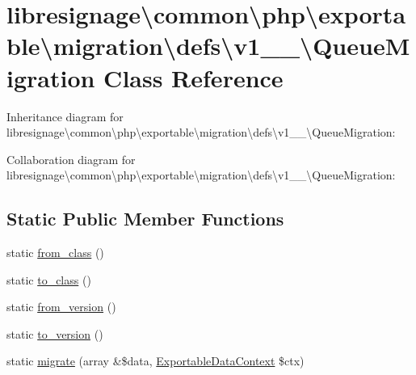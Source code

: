 \hypertarget{classlibresignage_1_1common_1_1php_1_1exportable_1_1migration_1_1defs_1_1v1__1__0_1_1QueueMigration}{}\section{libresignage\textbackslash{}common\textbackslash{}php\textbackslash{}exportable\textbackslash{}migration\textbackslash{}defs\textbackslash{}v1\+\_\+\_\textbackslash{}Queue\+Migration Class Reference}
\label{classlibresignage_1_1common_1_1php_1_1exportable_1_1migration_1_1defs_1_1v1__1__0_1_1QueueMigration}


Inheritance diagram for libresignage\textbackslash{}common\textbackslash{}php\textbackslash{}exportable\textbackslash{}migration\textbackslash{}defs\textbackslash{}v1\+\_\+\_\textbackslash{}Queue\+Migration\+:


Collaboration diagram for libresignage\textbackslash{}common\textbackslash{}php\textbackslash{}exportable\textbackslash{}migration\textbackslash{}defs\textbackslash{}v1\+\_\+\_\textbackslash{}Queue\+Migration\+:
\subsection*{Static Public Member Functions}
\begin{DoxyCompactItemize}
\item 
static \hyperlink{classlibresignage_1_1common_1_1php_1_1exportable_1_1migration_1_1defs_1_1v1__1__0_1_1QueueMigration_afcceac44f8c58cb12921b3ec526d4ec7}{from\+\_\+class} ()
\item 
static \hyperlink{classlibresignage_1_1common_1_1php_1_1exportable_1_1migration_1_1defs_1_1v1__1__0_1_1QueueMigration_a54a401888991918a47966cc788bd034a}{to\+\_\+class} ()
\item 
static \hyperlink{classlibresignage_1_1common_1_1php_1_1exportable_1_1migration_1_1defs_1_1v1__1__0_1_1QueueMigration_a5a8300b01e43b11fcdb7c8b5fc7a3fff}{from\+\_\+version} ()
\item 
static \hyperlink{classlibresignage_1_1common_1_1php_1_1exportable_1_1migration_1_1defs_1_1v1__1__0_1_1QueueMigration_a305bfc95b0ba822fe91cde871bc05cab}{to\+\_\+version} ()
\item 
static \hyperlink{classlibresignage_1_1common_1_1php_1_1exportable_1_1migration_1_1defs_1_1v1__1__0_1_1QueueMigration_aa2595bf3d836e03d6a8849159b414d8f}{migrate} (array \&\$data, \hyperlink{classlibresignage_1_1common_1_1php_1_1exportable_1_1ExportableDataContext}{Exportable\+Data\+Context} \$ctx)
\end{DoxyCompactItemize}


